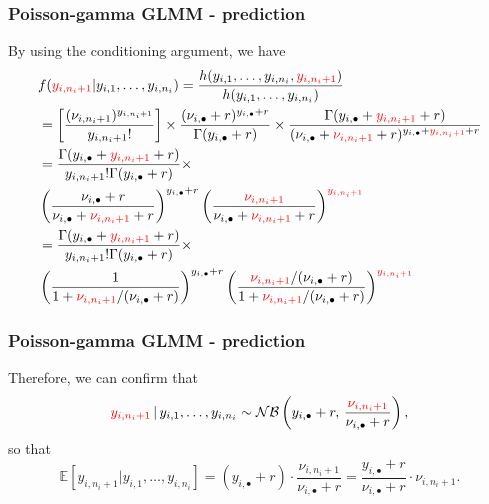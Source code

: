\documentclass[ignorenonframetext,]{beamer}
\begin{document}
\begin{frame}
\frametitle{Poisson-gamma GLMM - prediction}

By using the conditioning argument, we have
{\small
\begin{align*}
& f({\color{red}y_{i,n_i+1}}|y_{i,1}, \ldots, y_{i,n_i}) = \frac{h(y_{i,1}, \ldots, y_{i,n_i}, {\color{red}y_{i,n_i+1}})}{h(y_{i,1}, \ldots, y_{i,n_i})} \\
&= \left[ \frac{(\nu_{i,n_i+1})^{y_{i,n_i+1}}}{y_{i,n_i+1}!} \right] \times \frac{(\nu_{i,\bullet}+r)^{y_{i,\bullet}+r}}{\Gamma(y_{i,\bullet}+r)} \times \frac{\Gamma(y_{i,\bullet} + {\color{red}y_{i,n_i+1}} + r)}{(\nu_{i,\bullet} + {\color{red}\nu_{i,n_i+1}} + r)^{y_{i,\bullet} + {\color{red}y_{i,n_i+1}} + r}} \\
&= \frac{\Gamma(y_{i,\bullet} + {\color{red}y_{i,n_i+1}} + r)}{y_{i,n_i+1}!\Gamma(y_{i,\bullet}+r)} \times \\
& \left( \frac{\nu_{i,\bullet}+r}{\nu_{i,\bullet} + {\color{red}\nu_{i,n_i+1}} + r} \right)^{y_{i,\bullet}+r} \left( \frac{{\color{red}\nu_{i,n_i+1}}}{\nu_{i,\bullet} + {\color{red}\nu_{i,n_i+1}} + r} \right)^{{\color{red}y_{i,n_i+1}}} \\
&= \frac{\Gamma(y_{i,\bullet} + {\color{red}y_{i,n_i+1}} + r)}{y_{i,n_i+1}!\Gamma(y_{i,\bullet}+r)} \times \\
& \left( \frac{1}{1 + {\color{red}\nu_{i,n_i+1}}/(\nu_{i,\bullet}+r)} \right)^{y_{i,\bullet}+r} \left( \frac{{\color{red}\nu_{i,n_i+1}}/(\nu_{i,\bullet}+r)}{1 + {\color{red}\nu_{i,n_i+1}}/(\nu_{i,\bullet}+r)} \right)^{{\color{red}y_{i,n_i+1}}}
\end{align*}
}

\end{frame}

\begin{frame}
\frametitle{Poisson-gamma GLMM - prediction}

Therefore, we can confirm that
$$
{\color{red}y_{i,n_i+1}} \, | \, y_{i,1}, \ldots, y_{i,n_i} \sim \mathcal{NB}\left( y_{i,\bullet} + r, \, \frac{{\color{red}\nu_{i,n_i+1}}}{\nu_{i,\bullet} + r} \right),
$$
so that
$$
\mathbb{E}[y_{i,n_i+1}|y_{i,1}, \ldots, y_{i,n_i}] = (y_{i,\bullet}+r) \cdot \frac{\nu_{i,n_i+1}}{\nu_{i,\bullet}+r} = \frac{y_{i,\bullet}+r}{\nu_{i,\bullet}+r} \cdot \nu_{i,n_i+1}.
$$

\end{frame}
\end{document}
